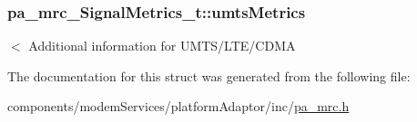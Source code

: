 \subsubsection[{\texorpdfstring{umts\+Metrics}{umtsMetrics}}]{ pa\+\_\+mrc\+\_\+\+Signal\+Metrics\+\_\+t\+::umts\+Metrics}\hypertarget{structpa__mrc___signal_metrics__t_a6941106d20ccefcbb170adfe596ef3a7}{}\label{structpa__mrc___signal_metrics__t_a6941106d20ccefcbb170adfe596ef3a7}


$<$ Additional information for U\+M\+T\+S/\+L\+T\+E/\+C\+D\+MA 



The documentation for this struct was generated from the following file\+:\begin{DoxyCompactItemize}
\item 
components/modem\+Services/platform\+Adaptor/inc/\hyperlink{pa__mrc_8h}{pa\+\_\+mrc.\+h}\end{DoxyCompactItemize}
